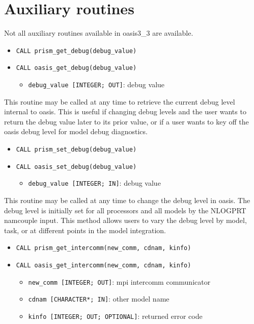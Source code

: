 
\section{Auxiliary routines}
\label{subsubsec_auxroutines}

Not all auxiliary routines available in oasis3\_3 are available.

\begin{itemize} 
\item {\tt CALL prism\_get\_debug(debug\_value)}
\item {\tt CALL oasis\_get\_debug(debug\_value)}
\begin{itemize}
\item {\tt debug\_value [INTEGER; OUT]}: debug value
\end{itemize}
\end{itemize}

This routine may be called at any time to retrieve the current
debug level internal to oasis.  This is useful if changing debug
levels and the user wants to return the debug value later to
its prior value, or if a user wants to key off the oasis
debug level for model debug diagnostics.

\begin{itemize} 
\item {\tt CALL prism\_set\_debug(debug\_value)}
\item {\tt CALL oasis\_set\_debug(debug\_value)}
\begin{itemize}
\item {\tt debug\_value [INTEGER; IN]}: debug value
\end{itemize}
\end{itemize}

This routine may be called at any time to change the debug level in oasis.
The debug level is initially set for all processors and all models
by the NLOGPRT namcouple input.  This method allows users to vary 
the debug level by model, task, or at different points in the model
integration.



\begin{itemize} 
\item {\tt CALL prism\_get\_intercomm(new\_comm, cdnam, kinfo)}
\item {\tt CALL oasis\_get\_intercomm(new\_comm, cdnam, kinfo)}
\begin{itemize}
\item {\tt new\_comm [INTEGER; OUT]}: mpi intercomm communicator
\item {\tt cdnam [CHARACTER*; IN]}: other model name 
\item {\tt kinfo [INTEGER; OUT; OPTIONAL]}: returned error code
\end{itemize}
\end{itemize}

